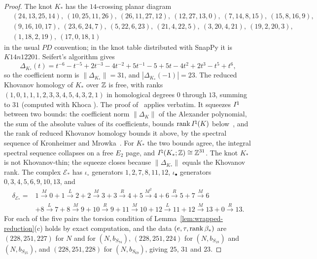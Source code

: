 \begin{proof}
The knot $K_*$ has the $14$-crossing planar diagram
\[
\begin{aligned}
&(24,13,25,14),\ (10,25,11,26),\ (26,11,27,12),\ (12,27,13,0),\ (7,14,8,15),\ (15,8,16,9),\\
&(9,16,10,17),\ (23,6,24,7),\ (5,22,6,23),\ (21,4,22,5),\ (3,20,4,21),\ (19,2,20,3),\\
&(1,18,2,19),\ (17,0,18,1)
\end{aligned}
\]
in the usual $PD$ convention; in the knot table distributed with SnapPy \cite{SnapPy} it is $K14n12201$.
Seifert's algorithm gives
\[
 \Delta_{K_*}(t)=t^{-6}-t^{-5}+2t^{-3}-4t^{-2}+5t^{-1}-5+5t-4t^2+2t^3-t^5+t^6,
\]
so the coefficient norm is $\|\Delta_{K_*}\|=31$, and $|\Delta_{K_*}(-1)|=23$.  The reduced Khovanov homology of $K_*$ over $\mathbb{Z}$ is free,
with ranks $(1,0,1,1,1,2,3,3,4,5,4,3,2,1)$ in homological degrees $0$ through $13$, summing to $31$
(computed with Khoca \cite{Khoca}).  The proof of~\cite[Thm.~1.1]{WuebbenII} applies verbatim.  It squeezes
$I^{\natural}$ between two bounds: the coefficient norm $\|\Delta_K\|$ of the Alexander polynomial, the sum of the absolute values
of its coefficients, bounds $\operatorname{rank}I^{\natural}(K)$ below~\cite{KMAlex}, and the rank of reduced Khovanov homology bounds it
above, by the spectral sequence of Kronheimer and Mrowka~\cite{KM2}.  For $K_*$ the two bounds agree, the integral
spectral sequence collapses on a free $E_2$ page, and $I^{\natural}(K_*;\mathbb{Z})\cong\mathbb{Z}^{31}$.  The knot $K_*$ is not Khovanov-thin; the squeeze closes because $\|\Delta_{K_*}\|$
equals the Khovanov rank.  The complex $\mathcal E_*$ has $\iota_\circ$ generators $1,2,7,8,11,12$,
$\iota_\bullet$ generators $0,3,4,5,6,9,10,13$, and
\begin{equation}\label{eq:aux-typeD}
\begin{aligned}
 \delta_{\mathcal E_*}={}&1\xrightarrow M0+1\xrightarrow L2+2\xrightarrow M3+3\xrightarrow R4
 +5\xrightarrow{M^2}4+6\xrightarrow R5+7\xrightarrow M6\\
 &+8\xrightarrow L7+8\xrightarrow M9+10\xrightarrow R9+11\xrightarrow M10
 +12\xrightarrow L11+12\xrightarrow M13+0\xrightarrow R13 .
\end{aligned}
\end{equation}
For each of the five pairs the torsion condition of Lemma~\ref{lem:wrapped-reduction}(c) holds by exact
computation, and the data $(e,\tau,\operatorname{rank}\beta_*)$ are $(228,251,227)$ for $N$ and
for $(N,b_{S_{74}})$, $(228,251,224)$ for $(N,b_{S_{18}})$ and $(N,b_{S_{25}})$, and $(228,251,228)$ for
$(N,b_{S_{69}})$, giving $25$, $31$ and $23$.
\end{proof}

